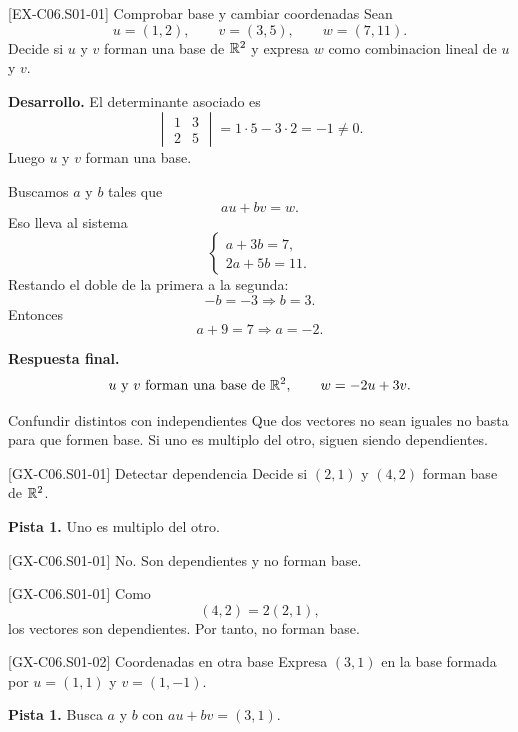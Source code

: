 \begin{solvedexample}{[EX-C06.S01-01] Comprobar base y cambiar coordenadas}
Sean
\[
u=(1,2),\qquad v=(3,5),\qquad w=(7,11).
\]
Decide si \(u\) y \(v\) forman una base de \(\mathbb{R}^2\) y expresa \(w\) como combinacion lineal de
\(u\) y \(v\).

\textbf{Desarrollo.} El determinante asociado es
\[
\begin{vmatrix}
1 & 3\\
2 & 5
\end{vmatrix}=1\cdot 5-3\cdot 2=-1\neq 0.
\]
Luego \(u\) y \(v\) forman una base.

Buscamos \(a\) y \(b\) tales que
\[
au+bv=w.
\]
Eso lleva al sistema
\[
\begin{cases}
a+3b=7,\\
2a+5b=11.
\end{cases}
\]
Restando el doble de la primera a la segunda:
\[
-b=-3 \Longrightarrow b=3.
\]
Entonces
\[
a+9=7 \Longrightarrow a=-2.
\]

\textbf{Respuesta final.}
\[
u \text{ y } v \text{ forman una base de } \mathbb{R}^2,
\qquad
w=-2u+3v.
\]
\end{solvedexample}

\begin{commonerror}{Confundir distintos con independientes}
Que dos vectores no sean iguales no basta para que formen base. Si uno es multiplo del otro,
siguen siendo dependientes.
\end{commonerror}

\begin{guidedexercise}{[GX-C06.S01-01] Detectar dependencia}
Decide si \((2,1)\) y \((4,2)\) forman base de \(\mathbb{R}^2\).

\textbf{Pista 1.} Uno es multiplo del otro.
\end{guidedexercise}

\begin{shortanswer}{[GX-C06.S01-01]}
No. Son dependientes y no forman base.
\end{shortanswer}

\begin{fullsolution}{[GX-C06.S01-01]}
Como
\[
(4,2)=2(2,1),
\]
los vectores son dependientes. Por tanto, no forman base.
\end{fullsolution}

\begin{guidedexercise}{[GX-C06.S01-02] Coordenadas en otra base}
Expresa \((3,1)\) en la base formada por \(u=(1,1)\) y \(v=(1,-1)\).

\textbf{Pista 1.} Busca \(a\) y \(b\) con \(au+bv=(3,1)\).
\end{guidedexercise}

